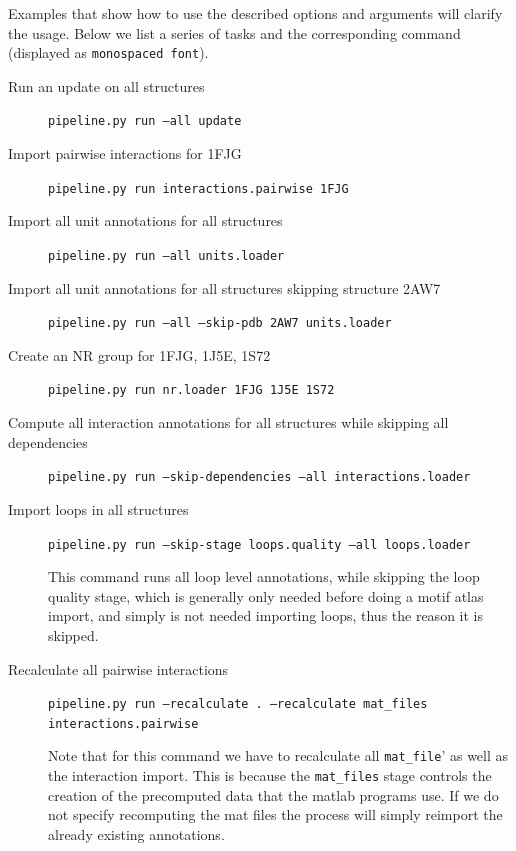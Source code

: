 Examples that show how to use the described options and arguments will clarify
the usage. Below we list a series of tasks and the corresponding command
(displayed as {\tt monospaced font}).

\begin{description}
        \item [Run an update on all structures]
                {\tt pipeline.py run --all update}

        \item [Import pairwise interactions for 1FJG]
                {\tt pipeline.py run interactions.pairwise 1FJG}

        \item [Import all unit annotations for all structures]
                {\tt pipeline.py run --all units.loader}

        \item [Import all unit annotations for all structures skipping structure 2AW7]
                {\tt pipeline.py run --all --skip-pdb 2AW7 units.loader}

        \item [Create an NR group for 1FJG, 1J5E, 1S72]
                {\tt pipeline.py run nr.loader 1FJG 1J5E 1S72}

        \item [Compute all interaction annotations for all structures while skipping all dependencies]
                {\tt pipeline.py run --skip-dependencies --all interactions.loader}

        \item [Import loops in all structures]
                {\tt pipeline.py run --skip-stage loops.quality --all loops.loader}

                This command runs all loop level annotations, while skipping the loop quality stage,
                which is generally only needed before doing a motif atlas import, and simply is not
                needed importing loops, thus the reason it is skipped.

        \item [Recalculate all pairwise interactions]
                {\tt pipeline.py run --recalculate . --recalculate mat\_files interactions.pairwise}

                Note that for this command we have to recalculate all
                {\tt mat\_file}' as well as the interaction import. This is
                because the {\tt mat\_files} stage controls the creation of the
                precomputed data that the matlab programs use. If we do not
                specify recomputing the mat files the process will simply
                reimport the already existing annotations.



\end{description}
